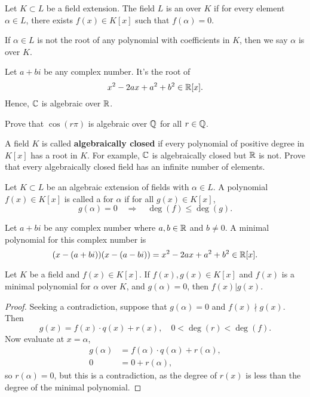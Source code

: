 \documentclass{ximera}
\begin{document}
\begin{definition}
  Let $K\subset L$ be a field extension. The field $L$ is an
   over $K$ if for every element $\alpha\in
  L$, there exists $f(x) \in K[x]$ such that $f(\alpha) = 0$.


  If $\alpha\in L$ is not the root of any polynomial with coefficients
  in $K$, then we say $\alpha$ is  over $K$.
\end{definition}

\begin{example}
  Let $a+ bi$ be any complex number. It's the root of
  \[
  x^2 -2ax + a^2 + b^2 \in \mathbb R[x].
  \]
  Hence, $\mathbb C$ is algebraic over $\mathbb R$.
\end{example}

\begin{exercise}
  Prove that $\cos(r\pi)$ is algebraic over $\mathbb Q$ for all $r\in\mathbb Q$.
\end{exercise}

\begin{exercise}
  A field $K$ is called \textbf{algebraically closed} if every
  polynomial of positive degree in $K[x]$ has a root in $K$. For
  example, $\mathbb C$ is algebraically closed but $\mathbb R$ is not. Prove that
  every algebraically closed field has an infinite number of elements.
\end{exercise}


\begin{definition}
  Let $K\subset L$ be an algebraic extension of fields with
  $\alpha\in L$. A polynomial $f(x)\in K[x]$ is called a  for $\alpha$ if for all $g(x)\in K[x]$,
  \[
  g(\alpha) = 0 \quad\Rightarrow\quad \deg(f) \le \deg(g).
  \]
\end{definition}

\begin{example}
  Let $a+bi$ be any complex number where $a,b\in\mathbb R$ and $b\ne 0$. A
  minimal polynomial for this complex number is
  \[
  (x-(a+bi))(x-(a-bi)) = x^2 -2ax +a^2 + b^2\in\mathbb R[x].
  \]
\end{example}

\begin{lemma}
  Let $K$ be a field and $f(x)\in K[x]$. If $f(x),g(x)\in K[x]$ and
  $f(x)$ is a minimal polynomial for $\alpha$ over $K$, and $g(\alpha)
  = 0$, then $f(x) | g(x)$.
  \begin{proof}
    Seeking a contradiction, suppose that $g(\alpha) = 0$ and $f(x)
    \nmid g(x)$. Then
    \[
    g(x) = f(x) \cdot q(x) + r(x), \quad 0<\deg(r)< \deg(f).
    \]
    Now evaluate at $x = \alpha$,
    \begin{align*}
      g(\alpha) &= f(\alpha) \cdot q(\alpha) + r(\alpha),\\
      0 &= 0 + r(\alpha),
    \end{align*}
    so $r(\alpha)=0$, but this is a contradiction, as the degree of
    $r(x)$ is less than the degree of the minimal polynomial.
  \end{proof}
\end{lemma}
\end{document}
